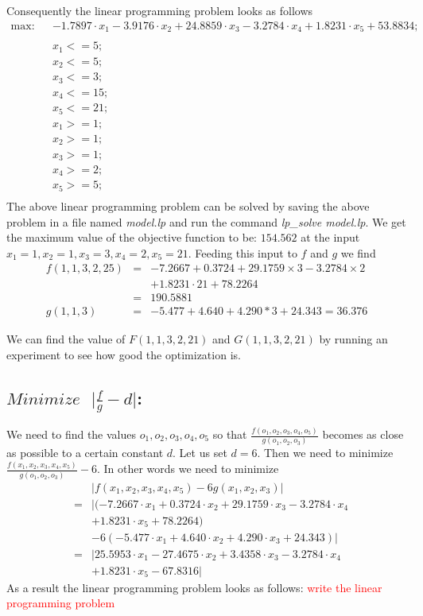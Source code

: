 \documentclass[12pt]{article}
\begin{document}
 Consequently the linear programming problem looks as follows
\begin{eqnarray*}
\text{max:} & & -1.7897 \cdot x_1 - 3.9176 \cdot x_2 + 24.8859 \cdot x_3 - 3.2784 \cdot x_4 + 1.8231 \cdot x_5 + 53.8834;\\
\\
& & x_1 <= 5;\\
& & x_2 <= 5;\\
& & x_3 <= 3;\\
& & x_4 <= 15;\\
& & x_5 <= 21;\\
& & x_1 >= 1;\\
& & x_2 >= 1;\\
& & x_3 >= 1;\\
& & x_4 >= 2;\\
& & x_5 >= 5;\\
\end{eqnarray*}
The above linear programming problem can be solved by saving the above problem in a file named \textit{model.lp} and run the command \textit{lp\_solve model.lp}. We get the maximum value of the objective function to be: $154.562$ at the input $x_1 = 1,x_2 = 1,x_3 = 3, x_4 = 2, x_5 = 21$. Feeding this input to $f$ and $g$ we find
\begin{eqnarray*}
f(1,1,3,2,25) &=& -7.2667 + 0.3724 + 29.1759 \times 3 - 3.2784 \times 2\\
& & + 1.8231 \cdot 21 + 78.2264\\
&=& 190.5881\\
g(1,1,3) &=& -5.477 + 4.640 + 4.290 * 3 + 24.343 = 36.376
\end{eqnarray*}

We can find the value of $F(1,1,3,2,21)$ and $G(1,1,3,2,21)$ by running an experiment to see how good the optimization is.


\subsection{$Minimize \text{ } \vert\frac{f}{g}-d\vert$:} We need to find the values $o_1,o_2,o_3,o_4,o_5$ so that $\frac{f(o_1,o_2,o_3,o_4,o_5)}{g(o_1,o_2,o_3)}$ becomes as close as possible to a certain constant $d$. Let us set $d=6$. Then we need to minimize $\frac{f(x_1,x_2,x_3,x_4,x_5)}{g(o_1,o_2,o_3)}-6$. In other words we need to minimize 
\begin{eqnarray*}
& & \vert f(x_1,x_2,x_3,x_4,x_5) - 6 g(x_1,x_2,x_3) \vert\\
&=& \vert(-7.2667 \cdot x_1 + 0.3724 \cdot x_2 + 29.1759 \cdot x_3 - 3.2784 \cdot x_4\\
& & + 1.8231 \cdot x_5 + 78.2264)\\
& & - 6(-5.477 \cdot x_1 + 4.640 \cdot x_2 + 4.290 \cdot x_3 + 24.343)\vert \\
&=& \vert 25.5953 \cdot x_1 - 27.4675 \cdot x_2 + 3.4358 \cdot x_3 - 3.2784 \cdot x_4\\
& & + 1.8231 \cdot x_5 - 67.8316 \vert
\end{eqnarray*}
 As a result the linear programming problem looks as follows:
\textcolor{red}{write the linear programming problem}
\end{document}
